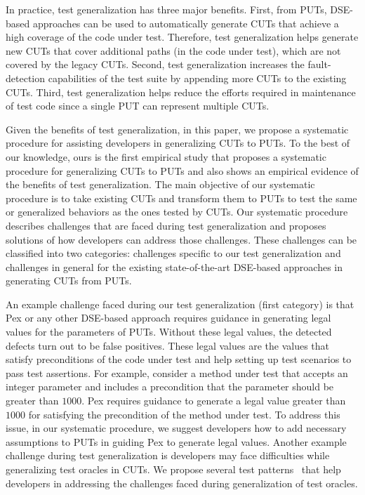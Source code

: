 In practice, test generalization has three major benefits. First, from PUTs, DSE-based approaches can be used to automatically generate CUTs that achieve a high coverage
of the code under test. Therefore, test generalization helps generate new CUTs that cover additional paths (in the code under test), which are not covered by the legacy CUTs. Second, test generalization increases the fault-detection capabilities of the test suite by appending more CUTs to the existing CUTs. Third, test generalization helps reduce the efforts required in maintenance of test code since a single PUT can represent multiple CUTs. 

Given the benefits of test generalization, in this paper, we propose a systematic procedure for assisting developers in generalizing CUTs to PUTs. To the best of our knowledge, ours is the first empirical study that proposes a systematic procedure for generalizing CUTs to PUTs and also shows an empirical evidence of the benefits of test generalization. The main objective of our systematic procedure is to take existing CUTs and transform them to PUTs to test the same or generalized behaviors as the ones tested by CUTs. 
Our systematic procedure describes challenges that are faced during test generalization and proposes solutions of how developers can address those challenges. These challenges can be classified into two categories: challenges specific to our test generalization and challenges in general for the existing state-of-the-art DSE-based approaches in generating CUTs from PUTs. 

An example challenge faced during our test generalization (first category) is that Pex or any other DSE-based approach requires guidance in generating legal values for the parameters of PUTs. Without these legal values, the detected defects turn out to be false positives. These legal values are the values that satisfy preconditions of the code under test and help setting up test scenarios to pass test assertions. For example, consider a method under test that accepts an integer parameter and includes a precondition that the parameter should be greater than $1000$. Pex requires guidance to generate a legal value greater than $1000$ for satisfying the precondition of the method under test. To address this issue, in our systematic procedure, we suggest developers how to add necessary assumptions to PUTs in guiding Pex to generate legal values. Another example challenge during test generalization is developers may face difficulties while generalizing test oracles in CUTs. We propose several test patterns~\cite{halleux08:putpatterns} that help developers in addressing the challenges faced during generalization of test oracles.

